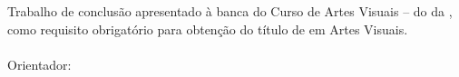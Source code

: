 %
%

\makeatletter
\begin{folhaderosto}
	\thispagestyle{empty}%
	
    \begin{center}
    
		\small\textbf{\expandafter\uppercase\expandafter{\imprimirnomeautor}}\\
		\vspace*{8.2 cm}%
		\normalsize\textbf{\expandafter\uppercase\expandafter{\imprimirtitulotb}}\\
		
    \end{center}
	
	\vspace*{0.35 cm}%
		    \large%
    		\hfill%
	    	\begin{minipage}{8 cm}%
	    		\begin{small} %
	    		\setlength{\baselineskip}{0.7\baselineskip}
				
				{Trabalho de conclusão apresentado à banca do Curso de Artes Visuais – {\imprimirprograma } do {\imprimirdepartamento} da {\imprimirinstituicao}, como requisito obrigatório para obtenção do título de {\imprimirgrau} em Artes Visuais.}\\{
		    	}\\Orientador: {\imprimirtitulacaoorientador }{ }{\imprimirorientador}\\{
		    	}
				
				
				\end{small} %
		    \end{minipage}%
		    	
		    \vspace*{10 cm}%
		    
		    \begin{center} %
		    	\normalsize %
	    		\imprimirlocal\\
	    		\imprimirdata
	    	\end{center}%

\end{folhaderosto}
\makeatother
